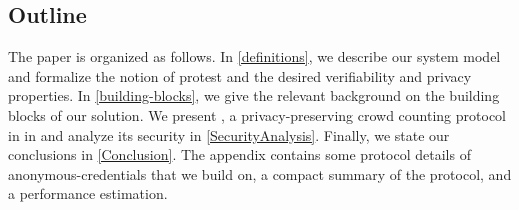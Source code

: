 \subsection{Outline}

The paper is organized as follows.
In \cref{definitions}, we describe our system model and formalize the notion of 
protest and the desired verifiability and privacy properties.
In \cref{building-blocks}, we give the relevant background on the building 
blocks of our solution.
%
%
We present \CROCUS, a privacy-preserving crowd counting 
protocol in in  and analyze its security in
\cref{SecurityAnalysis}.
Finally, we state
our conclusions in \cref{Conclusion}. The appendix contains some
protocol details of anonymous-credentials that we build on, a compact
summary of the \CROCUS protocol, and a
performance estimation. 
